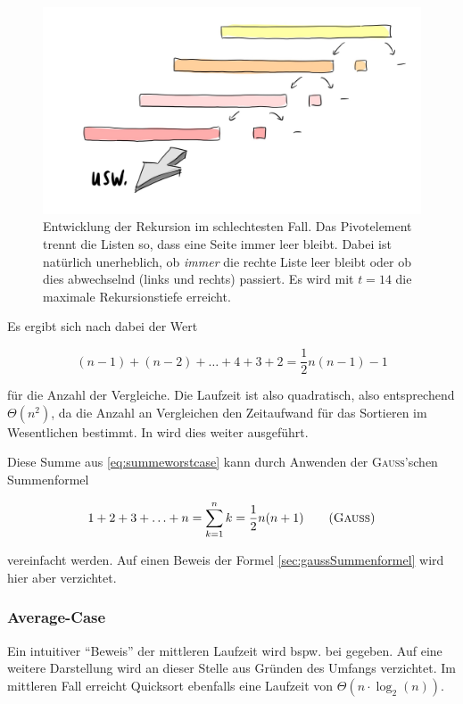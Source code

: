 \documentclass[11pt, a4paper, oneside, openright]{article}
\newcommand \Seite{S.\,}
\begin{document}
\begin{figure}[H]
    \centering
    \includegraphics[width=12cm]{bilder/qs_worstcase.jpg}
    \caption[Darstellung der Rekursion im Worst-Case.]{Entwicklung der Rekursion im schlechtesten Fall. Das Pivotelement trennt die Listen so, dass eine Seite immer leer bleibt. Dabei ist natürlich unerheblich, ob \emph{immer} die rechte Liste leer bleibt oder ob dies abwechselnd (links und rechts) passiert. Es wird mit $t = 14$ die maximale Rekursionstiefe erreicht.}
    \label{fig:raspberry_logo}
\end{figure}

Es ergibt sich nach \cite[\Seite 119]{schoeninghQ1Q2} dabei der Wert 

\begin{equation}
(n-1) + (n-2) + \ldots + 4 + 3 + 2 = \frac{1}{2}n(n-1)-1 \label{eq:summeworstcase}
\end{equation}

für die Anzahl der Vergleiche. Die Laufzeit ist also quadratisch, also entsprechend $\Theta\left(n^2\right)$, da die Anzahl an Vergleichen den Zeitaufwand für das Sortieren im Wesentlichen bestimmt. In \cite{khanqslaufzeit} wird dies weiter ausgeführt.

Diese Summe aus \eqref{eq:summeworstcase} kann durch Anwenden der \textsc{Gauß}'schen Summenformel 

\begin{equation}
1 + 2 + 3 + \ldots + n = \sum_{k=1}^n k = \frac{1}{2}n(n+1) \tag{\textsc{Gauss}}\label{sec:gaussSummenformel}
\end{equation}

vereinfacht werden. Auf einen Beweis der Formel \eqref{sec:gaussSummenformel} wird hier aber verzichtet.





\subsubsection{Average-Case}
Ein intuitiver \enquote{Beweis} der mittleren Laufzeit wird bspw. bei \cite{khanqslaufzeit} gegeben. Auf eine weitere Darstellung wird an dieser Stelle aus Gründen des Umfangs verzichtet. Im mittleren Fall erreicht Quicksort ebenfalls eine Laufzeit von $\Theta\left(n \cdot \log_2{(n)}\right)$.
\end{document}
